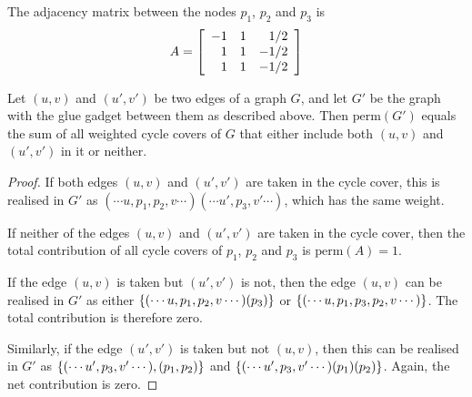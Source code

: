 \begin{center}
\end{center}
The adjacency matrix between the nodes $p_1$, $p_2$ and $p_3$ is 
\[
A = \left[\begin{array}{rrr}
-1 & 1 & 1/2\\
1 & 1 & -1/2\\
1 & 1 & -1/2
\end{array}\right]
\]

\noindent
\begin{claim}
Let $(u,v)$ and $(u',v')$ be two edges of a graph $G$, and let $G'$ be the graph with the glue gadget between them as described above. Then $\mathrm{perm}(G')$ equals the sum of all weighted cycle covers of $G$ that either include both $(u,v)$ and $(u',v')$ in it or neither. 
\end{claim}
\begin{proof}
If both edges $(u,v)$ and $(u',v')$ are taken in the cycle cover, this is realised in $G'$ as ${(\cdots u,p_1, p_2, v \cdots) (\cdots u', p_3, v' \cdots)}$, which has the same weight.  

If neither of the edges $(u,v)$ and $(u',v')$ are taken in the cycle cover, then the total contribution of all cycle covers of $p_1$, $p_2$ and $p_3$ is $\mathrm{perm}(A) = 1$. 

If the edge $(u,v)$ is taken but $(u',v')$ is not, then the edge $(u,v)$ can be realised in $G'$ as either $\left\{(\cdots u,p_1,p_2,v \cdots) (p_3)\right\}$ or $\left\{(\cdots u,p_1,p_3,p_2,v \cdots )\right\}$. The total contribution is therefore zero. 

Similarly, if the edge $(u',v')$ is taken but not $(u,v)$, then this can be realised in $G'$ as $\left\{(\cdots u',p_3,v' \cdots),(p_1,p_2)\right\}$ and $\left\{(\cdots u',p_3, v' \cdots) (p_1) (p_2)\right\}$. Again, the net contribution is zero.  
\end{proof}

